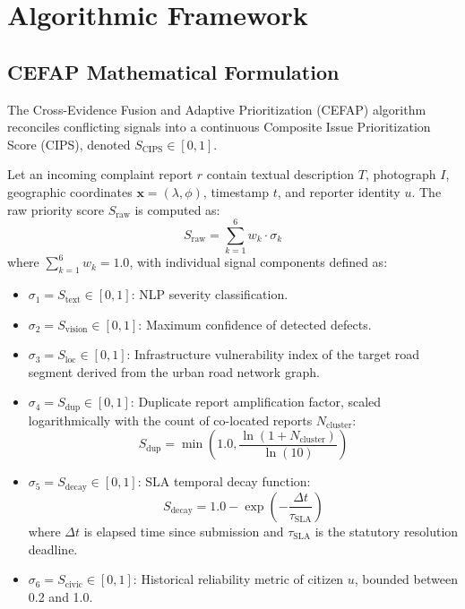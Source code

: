 \documentclass[conference]{IEEEtran}
\begin{document}
\section{Algorithmic Framework}
\label{sec:algorithms}

\subsection{CEFAP Mathematical Formulation}
The Cross-Evidence Fusion and Adaptive Prioritization (CEFAP) algorithm reconciles conflicting signals into a continuous Composite Issue Prioritization Score (CIPS), denoted $S_{\text{CIPS}} \in [0, 1]$.

Let an incoming complaint report $r$ contain textual description $T$, photograph $I$, geographic coordinates $\mathbf{x} = (\lambda, \phi)$, timestamp $t$, and reporter identity $u$. The raw priority score $S_{\text{raw}}$ is computed as:
\begin{equation}
    S_{\text{raw}} = \sum_{k=1}^{6} w_k \cdot \sigma_k
    \label{eq:sraw}
\end{equation}
where $\sum_{k=1}^6 w_k = 1.0$, with individual signal components defined as:
\begin{itemize}
    \item $\sigma_1 = S_{\text{text}} \in [0, 1]$: NLP severity classification.
    \item $\sigma_2 = S_{\text{vision}} \in [0, 1]$: Maximum confidence of detected defects.
    \item $\sigma_3 = S_{\text{loc}} \in [0, 1]$: Infrastructure vulnerability index of the target road segment derived from the urban road network graph.
    \item $\sigma_4 = S_{\text{dup}} \in [0, 1]$: Duplicate report amplification factor, scaled logarithmically with the count of co-located reports $N_{\text{cluster}}$:
    \begin{equation}
        S_{\text{dup}} = \min\left(1.0, \frac{\ln(1 + N_{\text{cluster}})}{\ln(10)}\right)
    \end{equation}
    \item $\sigma_5 = S_{\text{decay}} \in [0, 1]$: SLA temporal decay function:
    \begin{equation}
        S_{\text{decay}} = 1.0 - \exp\left(-\frac{\Delta t}{\tau_{\text{SLA}}}\right)
    \end{equation}
    where $\Delta t$ is elapsed time since submission and $\tau_{\text{SLA}}$ is the statutory resolution deadline.
    \item $\sigma_6 = S_{\text{civic}} \in [0, 1]$: Historical reliability metric of citizen $u$, bounded between 0.2 and 1.0.
\end{itemize}
\end{document}

